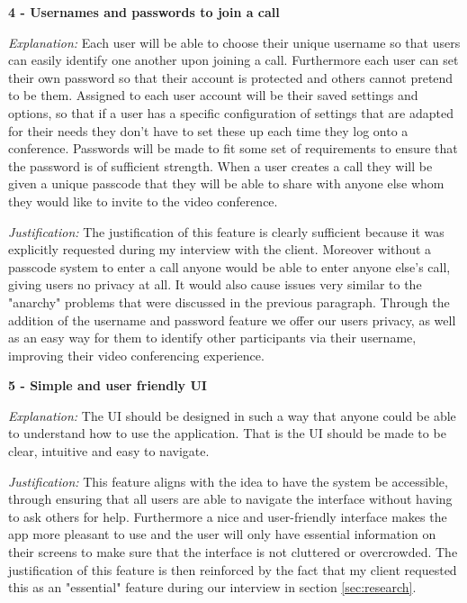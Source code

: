 \vspace{0.2cm}

\textsf{\bfseries 4 - Usernames and passwords to join a call} \\ 
\vspace{0.1cm}

\textit{Explanation:} Each user will be able to choose their unique username so 
that users can easily identify one another upon joining a 
call. Furthermore each user can set their own password so 
that their account is protected and others cannot pretend to 
be them. 
Assigned to each user account will be their saved settings and
options, so that if a user has a specific configuration of 
settings that are adapted for their needs they don't have to 
set these up each time they log onto a conference. Passwords 
will be made to fit some set of requirements to ensure that 
the password is of sufficient strength. When a user creates a 
call they will be given a unique passcode that they will be 
able to share with anyone else whom they would like to invite
to the video conference. \vspace{0.1cm}

\textit{Justification:} The justification of this feature is
clearly sufficient because it was explicitly requested during
my interview with the client. Moreover without a passcode 
system to enter a call anyone would be able to enter anyone
else's call, giving users no privacy at all. It would also 
cause issues very similar to the "anarchy" problems that 
were discussed in the previous paragraph. Through the
addition of the username and password feature we offer our 
users privacy, as well as an easy way for them to identify
other participants via their username, improving their
video conferencing experience.

\vspace{0.2cm}

\textsf{\bfseries 5 - Simple and user friendly UI} \\ \vspace{0.1cm}

\textit{Explanation:} 
The UI should be designed in such a way that anyone could be 
able to understand how to use the application. That is the UI
should be made to be clear, intuitive and easy to navigate.
\vspace{0.1cm}

\textit{Justification:} 
This feature
aligns with the idea to have the system be accessible,
through ensuring that all users are able to navigate the 
interface without having to ask others for help. Furthermore
a nice and user-friendly interface makes the app more 
pleasant to use and the user will only have essential 
information on their screens
to make sure that the interface is not cluttered or 
overcrowded. The justification of this feature is then 
reinforced by the fact that my client requested this as an 
"essential" feature during our interview
in section \ref{sec:research}. \vspace{0.2cm}

